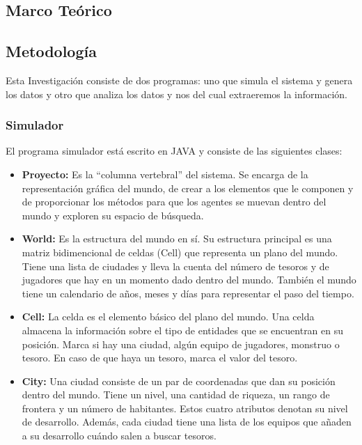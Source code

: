 \subsection*{Marco Teórico}{}
\subsection*{Metodología}{
    Esta Investigación consiste de dos programas: uno que simula el sistema y
    genera los datos y otro que analiza los datos y nos del cual extraeremos la
    información.
    \subsubsection*{Simulador}{El programa simulador está escrito en JAVA y
        consiste de las siguientes clases:
        \begin{itemize}
        \item{\textbf{Proyecto: }Es la ``columna vertebral'' del sistema. Se
            encarga de la representación gráfica del mundo, de crear a los
            elementos que le componen y de proporcionar los métodos para que los
            agentes se muevan dentro del mundo y exploren su espacio de
            búsqueda.
        }
        \item{\textbf{World: }Es la estructura del mundo en sí. Su estructura
            principal es una matriz bidimencional de celdas (Cell) que
            representa un plano del mundo. Tiene una lista de ciudades y lleva
            la cuenta del número de tesoros y de jugadores que hay en un momento
            dado dentro del mundo. También el mundo tiene un calendario de años,
            meses y días para representar el paso del tiempo.
        }
        \item{\textbf{Cell: }La celda es el elemento básico del plano del mundo.
            Una celda almacena la información sobre el tipo de entidades que se
            encuentran en su posición. Marca si hay una ciudad, algún equipo de
            jugadores, monstruo o tesoro. En caso de que haya un tesoro, marca
            el valor del tesoro.
        }
        \item{\textbf{City: }Una ciudad consiste de un par de coordenadas que
            dan su posición dentro del mundo. Tiene un nivel, una cantidad de
            riqueza, un rango de frontera y un número de habitantes. Estos
            cuatro atributos denotan su nivel de desarrollo. Además, cada
            ciudad tiene una lista de los equipos que añaden a su desarrollo
            cuándo salen a buscar tesoros.
}
\end{itemize}}}

